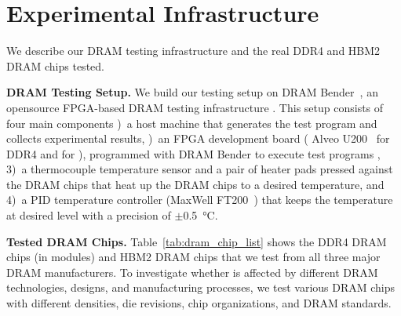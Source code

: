\section{Experimental Infrastructure}

We describe our DRAM testing infrastructure and the real DDR4 and HBM2 DRAM chips tested.

\noindent
\textbf{DRAM Testing Setup.} We build our testing setup on DRAM
Bender~\cite{olgun2023drambender,safari-drambender}, an open\gra{-}source
FPGA-based DRAM testing infrastructure . 
This setup consists of four main components )~a host machine that
generates the test program and collects experimental results, )~an FPGA
development board ( Alveo U200~\cite{alveo-u200} for DDR4 and
 for ), programmed with DRAM Bender to execute test programs , 3)~a thermocouple temperature sensor
and a pair of heater pads pressed against the DRAM chips that {heat} up the DRAM
chips to a desired temperature, and 4)~a PID temperature controller (MaxWell
FT200~\cite{maxwellFT200}) that keeps the temperature
at  desired level with a precision of $\pm$\SI{0.5}{\celsius}.


\noindent
\textbf{Tested DRAM Chips.}
Table~\ref{tab:dram_chip_list} shows the {\numDDRchips{} DDR4 DRAM chips (in
\nummodules{} modules) and \numHBMchips{} HBM2 DRAM chips} that we test from all
three major DRAM manufacturers. {To investigate whether \phenomenon{} is
affected by different DRAM technologies, designs, and manufacturing processes,
we test various} DRAM chips with different densities, die revisions, chip
organizations, and DRAM standards.

